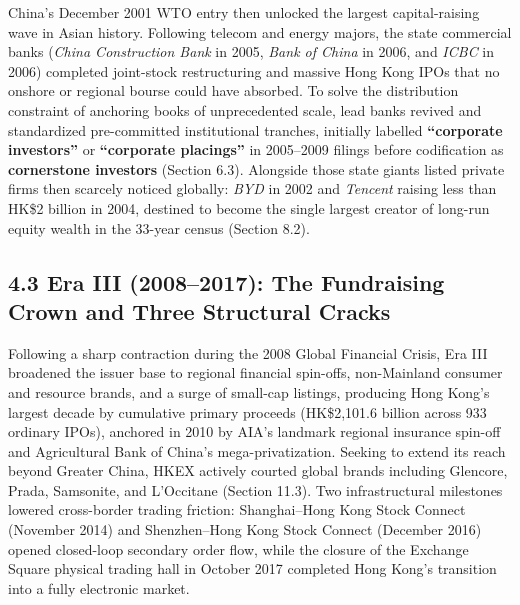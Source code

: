 \documentclass[11pt,letterpaper]{article}
\begin{document}
China's December 2001 WTO entry then unlocked the largest capital-raising wave in Asian history. Following telecom and energy majors, the state commercial banks (\textit{China Construction Bank} in 2005, \textit{Bank of China} in 2006, and \textit{ICBC} in 2006) completed joint-stock restructuring and massive Hong Kong IPOs that no onshore or regional bourse could have absorbed. To solve the distribution constraint of anchoring books of unprecedented scale, lead banks revived and standardized pre-committed institutional tranches, initially labelled \textbf{``corporate investors''} or \textbf{``corporate placings''} in 2005–2009 filings before codification as \textbf{cornerstone investors} (Section 6.3). Alongside those state giants listed private firms then scarcely noticed globally: \textit{BYD} in 2002 and \textit{Tencent} raising less than HK\$2 billion in 2004, destined to become the single largest creator of long-run equity wealth in the 33-year census (Section 8.2).

\subsection*{\texorpdfstring{4.3 Era III (2008–2017): The Fundraising Crown and Three Structural Cracks}{4.3 Era III (2008–2017): The Fundraising Crown and Three Structural Cracks}}
Following a sharp contraction during the 2008 Global Financial Crisis, Era III broadened the issuer base to regional financial spin-offs, non-Mainland consumer and resource brands, and a surge of small-cap listings, producing Hong Kong's largest decade by cumulative primary proceeds (HK\$2,101.6 billion across 933 ordinary IPOs), anchored in 2010 by AIA's landmark regional insurance spin-off and Agricultural Bank of China's mega-privatization. Seeking to extend its reach beyond Greater China, HKEX actively courted global brands including Glencore, Prada, Samsonite, and L'Occitane (Section 11.3). Two infrastructural milestones lowered cross-border trading friction: Shanghai–Hong Kong Stock Connect (November 2014) and Shenzhen–Hong Kong Stock Connect (December 2016) opened closed-loop secondary order flow, while the closure of the Exchange Square physical trading hall in October 2017 completed Hong Kong's transition into a fully electronic market.
\end{document}
